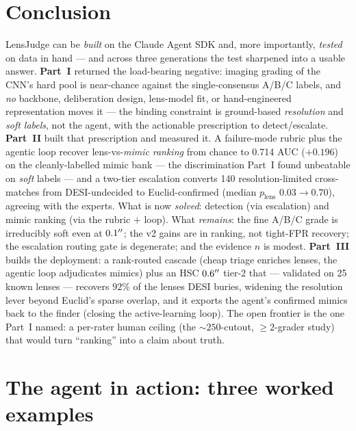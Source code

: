 \documentclass[11pt,letterpaper]{article}
\newcommand{\plens}{\ensuremath{p_{\mathrm{lens}}}}
\newcommand{\vBbenchTwo}{0.714}      %
\newcommand{\vBgain}{0.196}          %
\newcommand{\escN}{140}
\newcommand{\escMedOne}{0.03}\newcommand{\escMedTwo}{0.70} %
\newcommand{\hscCov}{25}\newcommand{\hscNcov}{26}     %
\newcommand{\hscRecov}{92}           %
\begin{document}
\section{Conclusion}
LensJudge can be \emph{built} on the Claude Agent SDK and, more importantly, \emph{tested} on data in
hand --- and across three generations the test sharpened into a usable answer. \textbf{Part~I} returned
the load-bearing negative: imaging grading of the CNN's hard pool is near-chance against the
single-consensus A/B/C labels, and \emph{no} backbone, deliberation design, lens-model fit, or
hand-engineered representation moves it --- the binding constraint is ground-based \emph{resolution}
and \emph{soft labels}, not the agent, with the actionable prescription to detect/escalate.
\textbf{Part~II} built that prescription and measured it. A failure-mode rubric plus the agentic loop
recover lens-vs-\emph{mimic} \emph{ranking} from chance to \vBbenchTwo{} AUC ($+\vBgain$) on the
cleanly-labelled mimic bank --- the discrimination Part~I found unbeatable on \emph{soft} labels ---
and a two-tier escalation converts \escN{} resolution-limited cross-matches from DESI-undecided to
Euclid-confirmed (median \plens{} $\escMedOne\!\to\!\escMedTwo$), agreeing with the experts. What is
now \emph{solved}: detection (via escalation) and mimic ranking (via the rubric $+$ loop). What
\emph{remains}: the fine A/B/C grade is irreducibly soft even at $0.1^{\prime\prime}$; the v2 gains are in
ranking, not tight-FPR recovery; the escalation routing gate is degenerate; and the evidence $n$ is
modest. \textbf{Part~III} builds the deployment: a rank-routed cascade (cheap triage enriches lenses,
the agentic loop adjudicates mimics) plus an HSC $0.6^{\prime\prime}$ tier-2 that --- validated on \hscCov{}
known lenses --- recovers $\hscRecov\%$ of the lenses DESI buries, widening the resolution lever
beyond Euclid's sparse overlap, and it exports the agent's confirmed mimics back to the finder
(closing the active-learning loop). The open frontier is the one Part~I named: a per-rater human
ceiling (the ${\sim}250$-cutout, $\ge2$-grader study) that would turn ``ranking'' into a claim about
truth.

\appendix
\section{The agent in action: three worked examples}
\label{app:examples}
\end{document}
